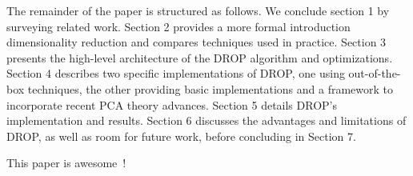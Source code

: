 The remainder of the paper is structured as follows. We conclude section 1 by surveying related work. Section 2 provides a more formal introduction dimensionality reduction and compares techniques used in practice. Section 3 presents the high-level architecture of the DROP algorithm and optimizations. Section 4 describes two specific implementations of DROP, one using out-of-the-box techniques, the other providing basic implementations and a framework to incorporate recent PCA theory advances. Section 5 details DROP's implementation and results. Section 6 discusses the advantages and limitations of DROP, as well as room for future work, before concluding in Section 7. 

This paper is awesome~\cite{smartdust}!
